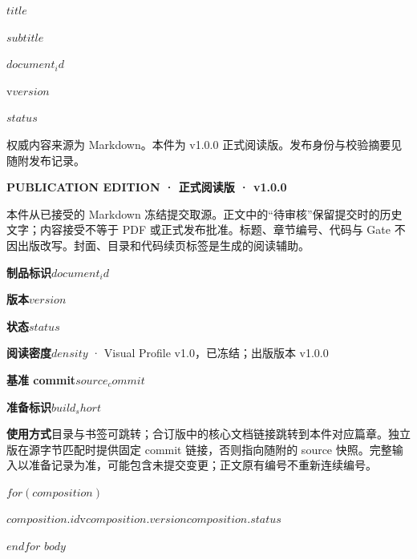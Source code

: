 \documentclass[UTF8,fontset=none,scheme=plain,11pt,a4paper,oneside,openany]{kbbook}
\begin{document}
\pagestyle{empty}
\pagecolor{PreviewNavy}\color{white}
\vspace*{30mm}
\begin{flushleft}{\sffamily\bfseries\fontsize{29}{38}\selectfont $title$\par}\end{flushleft}
\vspace{8mm}
{\sffamily\large $subtitle$\par}
\vfill
{\sffamily\small $document_id$\par\medskip v$version$\par\medskip $status$\par}
\vspace{10mm}
{\small 权威内容来源为 Markdown。本件为 v1.0.0 正式阅读版。发布身份与校验摘要见随附发布记录。\par}
\clearpage\nopagecolor\color{PreviewInk}\pagestyle{fancy}
\noindent\textbf{PUBLICATION EDITION · 正式阅读版 · v1.0.0}

本件从已接受的 Markdown 冻结提交取源。正文中的“待审核”保留提交时的历史文字；内容接受不等于 PDF 或正式发布批准。标题、章节编号、代码与 Gate 不因出版改写。封面、目录和代码续页标签是生成的阅读辅助。

\medskip
\noindent\textbf{制品标识}\quad $document_id$\par
\noindent\textbf{版本}\quad $version$\par
\noindent\textbf{状态}\quad $status$\par
\noindent\textbf{阅读密度}\quad $density$ · Visual Profile v1.0，已冻结；出版版本 v1.0.0\par
\noindent\textbf{基准 commit}\quad\texttt{$source_commit$}\par
\noindent\textbf{准备标识}\quad\texttt{$build_short$}\par
\noindent\textbf{使用方式}\quad 目录与书签可跳转；合订版中的核心文档链接跳转到本件对应篇章。独立版在源字节匹配时提供固定 commit 链接，否则指向随附的 source 快照。完整输入以准备记录为准，可能包含未提交变更；正文原有编号不重新连续编号。

$for(composition)$
\par\noindent\hyperlink{$composition.anchor$}{\textbf{$composition.id$}}\quad v$composition.version$\quad $composition.status$\par
$endfor$
\clearpage
\setcounter{tocdepth}{$toc_depth$}
\tableofcontents
\clearpage
$body$
\end{document}
